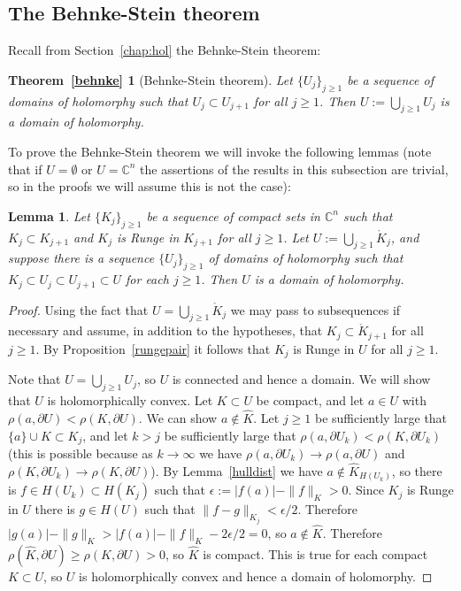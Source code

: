 \documentclass[11pt,a4paper, final, twoside]{article}
\newtheorem{lemma}[theorem]{Lemma}
\numberwithin{equation}{section}
\newcommand{\C}{\mathbb C}
\newcommand{\bd}{\partial}
\newcommand{\inter}[1]{\mathring{#1}}
\newcommand{\pmetric}{\rho}
\newcommand{\hol}{H}
\begin{document}
\subsection{The Behnke-Stein theorem}
Recall from Section~\ref{chap:hol} the Behnke-Stein theorem:
\newtheorem*{behnke}{Theorem~\ref{behnke}}
\begin{behnke}[Behnke-Stein theorem]
Let $\{U_j\}_{j\geq 1}$ be a sequence of domains of holomorphy such that $U_j\subset U_{j+1}$ for all $j\geq 1$. Then $U:=\bigcup_{j\geq 1} U_j$ is a domain of holomorphy.
\end{behnke}
To prove the Behnke-Stein theorem we will invoke the following lemmas (note that if $U=\emptyset$ or $U=\C^n$ the assertions of the results in this subsection
are trivial, so in the proofs we will assume this is not the case):
\begin{lemma}
\label{bslemma}
Let $\{K_j\}_{j\geq 1}$ be a sequence of compact sets in $\C^n$ such that $K_j\subset K_{j+1}$ and $K_j$ is Runge in $K_{j+1}$ for all $j\geq 1$. Let $U:=\bigcup_{j\geq 1} \inter K_j$, and suppose
there is a sequence $\{U_j\}_{j\geq 1}$ of domains of holomorphy such that $K_j\subset U_j\subset U_{j+1}\subset U$ for each $j\geq 1$. Then $U$ is a domain of holomorphy.
\end{lemma}
\begin{proof}
Using the fact that $U=\bigcup_{j\geq 1} \inter K_j$ we may pass to subsequences if necessary and assume, in addition to the hypotheses, that $K_j\subset\inter K_{j+1}$ for all $j\geq 1$.
By Proposition~\ref{rungepair} it follows that $K_j$ is Runge in $U$ for all $j\geq 1$.

Note that $U=\bigcup_{j\geq 1} U_j$, so $U$ is connected and hence a domain. We will show that $U$ is holomorphically convex. Let $K\subset U$ be compact, and let $a\in U$ with $\pmetric(a,\bd U)<\pmetric(K,\bd U)$.
We can show $a\not\in\hat K$. Let $j\geq 1$ be sufficiently large that $\{a\}\cup K\subset K_j$, and let $k>j$ be sufficiently large that
$\pmetric(a,\bd U_k)<\pmetric(K,\bd U_k)$ (this is possible because as $k\to\infty$ we have $\pmetric(a,\bd U_k)\to\pmetric(a,\bd U)$
and $\pmetric(K,\bd U_k)\to\pmetric(K,\bd U)$). By Lemma~\ref{hulldist} we have $a\not\in\hat K_{\hol(U_k)}$, so there is $f\in\hol(U_k)\subset \hol(K_j)$ such that
$\epsilon:=|f(a)|-\|f\|_K>0$. Since $K_j$ is Runge in $U$ there is $g\in\hol(U)$ such that $\|f-g\|_{K_j}<\epsilon/2$. Therefore $|g(a)|-\|g\|_K>|f(a)|-\|f\|_K-2\epsilon/2=0$,
so $a\not\in\hat K$. Therefore $\pmetric(\hat K,\bd U)\geq \pmetric(K,\bd U)>0$, so $\hat K$ is compact. This is true for each compact $K\subset U$, so $U$ is holomorphically convex and
hence a domain of holomorphy.
\end{proof}
\end{document}

